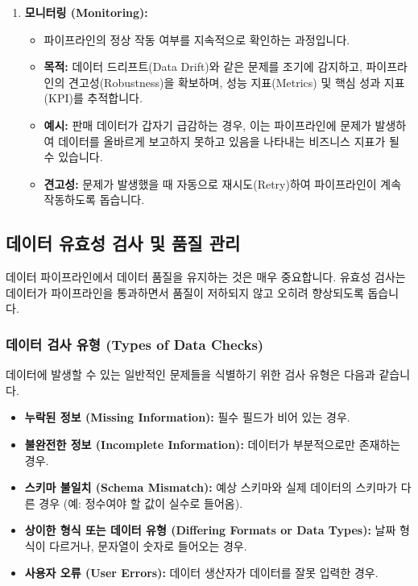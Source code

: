 \documentclass[11pt,a4paper]{article}
\begin{document}
\begin{enumerate}
\begin{enumerate}
    \item \textbf{모니터링 (Monitoring):}
    \begin{itemize}
        \item 파이프라인의 정상 작동 여부를 지속적으로 확인하는 과정입니다.
        \item \textbf{목적:} 데이터 드리프트(Data Drift)와 같은 문제를 조기에 감지하고, 파이프라인의 견고성(Robustness)을 확보하며, 성능 지표(Metrics) 및 핵심 성과 지표(KPI)를 추적합니다.
        \item \textbf{예시:} 판매 데이터가 갑자기 급감하는 경우, 이는 파이프라인에 문제가 발생하여 데이터를 올바르게 보고하지 못하고 있음을 나타내는 비즈니스 지표가 될 수 있습니다.
        \item \textbf{견고성:} 문제가 발생했을 때 자동으로 재시도(Retry)하여 파이프라인이 계속 작동하도록 돕습니다.
    \end{itemize}
\end{enumerate}

\newpage
\subsection{데이터 유효성 검사 및 품질 관리}

데이터 파이프라인에서 데이터 품질을 유지하는 것은 매우 중요합니다. 유효성 검사는 데이터가 파이프라인을 통과하면서 품질이 저하되지 않고 오히려 향상되도록 돕습니다.

\subsubsection{데이터 검사 유형 (Types of Data Checks)}
데이터에 발생할 수 있는 일반적인 문제들을 식별하기 위한 검사 유형은 다음과 같습니다.

\begin{itemize}
    \item \textbf{누락된 정보 (Missing Information):} 필수 필드가 비어 있는 경우.
    \item \textbf{불완전한 정보 (Incomplete Information):} 데이터가 부분적으로만 존재하는 경우.
    \item \textbf{스키마 불일치 (Schema Mismatch):} 예상 스키마와 실제 데이터의 스키마가 다른 경우 (예: 정수여야 할 값이 실수로 들어옴).
    \item \textbf{상이한 형식 또는 데이터 유형 (Differing Formats or Data Types):} 날짜 형식이 다르거나, 문자열이 숫자로 들어오는 경우.
    \item \textbf{사용자 오류 (User Errors):} 데이터 생산자가 데이터를 잘못 입력한 경우.
\end{itemize}


\end{enumerate}
\end{document}
